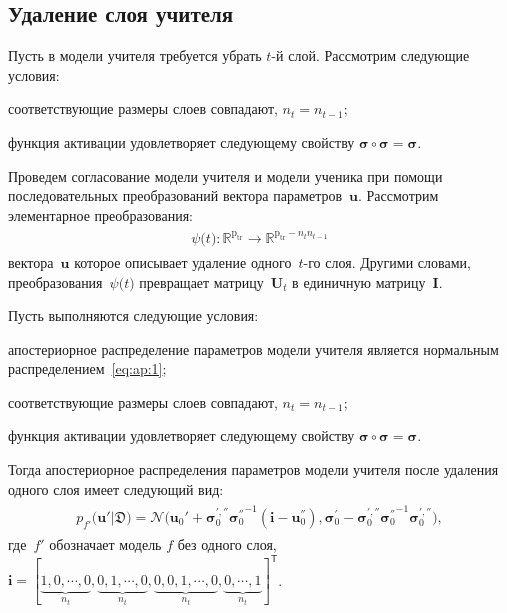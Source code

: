 \documentclass[12pt]{a&t}
\begin{document}
\subsection{Удаление слоя учителя}
Пусть в модели учителя требуется убрать $t$-й слой. Рассмотрим следующие условия:
\begin{enumlist}
    \item соответствующие размеры слоев совпадают, $n_t=n_{t-1}$;
    \item функция активации удовлетворяет следующему свойству $\bm{\sigma} \circ \bm{\sigma} = \bm{\sigma}$.
\end{enumlist}
Проведем согласование модели учителя и модели ученика при помощи последовательных преобразований вектора параметров~$\mathbf{u}$. Рассмотрим элементарное преобразования:
\begin{gather}
\label{eq:ap:4}
\begin{aligned}
\psi\bigr(t\bigr) : \mathbb{R}^{\text{p}_{\text{tr}}} \to \mathbb{R}^{\text{p}_{\text{tr}}-n_tn_{t-1}}
\end{aligned}
\end{gather}
вектора~$\mathbf{u}$ которое описывает удаление одного~$t$-го слоя. Другими словами, преобразования~$\psi\bigr(t\bigr)$ превращает матрицу~$\mathbf{U}_t$ в единичную матрицу~$\mathbf{I}$. 

\begin{theorem}
\label{theorem:ap:layer}
Пусть выполняются следующие условия:
\begin{enumlist}
\item апостериорное распределение параметров модели учителя является нормальным распределением~\eqref{eq:ap:1};
\item соответствующие размеры слоев совпадают, $n_t=n_{t-1}$;
\item функция активации удовлетворяет следующему свойству $\bm{\sigma} \circ \bm{\sigma} = \bm{\sigma}$.
\end{enumlist}
Тогда апостериорное распределения параметров модели учителя после удаления одного слоя имеет следующий вид:
\begin{gather}
\label{eq:ap:5}
\begin{aligned}
p_{f'}\bigr(\mathbf{u}'|\mathfrak{D}\bigr) = \mathcal{N}\bigr(\mathbf{u}_{0}'+\bm{\sigma}_0^{', ''}{\bm{\sigma}_0^{''}}^{-1}\left(\mathbf{i} - \mathbf{u}_0^{''}\right), \bm{\sigma}_0^{'}-\bm{\sigma}_0^{', ''}{\bm{\sigma}_0^{''}}^{-1}\bm{\sigma}_0^{', ''}\bigr),
\end{aligned}
\end{gather}
где~$f'$ обозначает модель $f$ без одного слоя, $\mathbf{i}=[\underbrace{1, 0, \cdots, 0}_{n_t}, \underbrace{0, 1, \cdots, 0}_{n_t}, \underbrace{0, 0, 1, \cdots, 0}_{n_t}, \underbrace{0, \cdots, 1}_{n_t}]^{\mathsf{T}}$.
\end{theorem}
\end{document}

